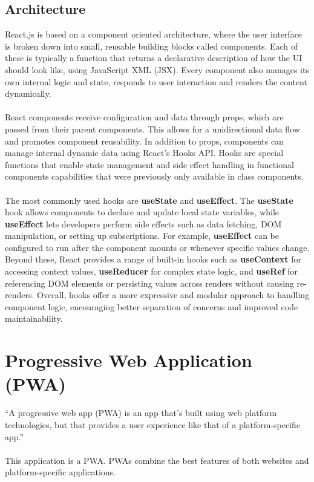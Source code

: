 \documentclass[a4paper,12pt]{report}
\begin{document}
\subsection{Architecture}
React.js is based on a component oriented architecture, where the user interface is broken down into small, reusable building blocks called components. Each of these is typically a function that returns a declarative description of how the UI should look like, using JavaScript XML (JSX). Every component also manages its own internal logic and state, responds to user interaction and renders the content dynamically. \\ \\
React components receive configuration and data through props, which are passed from their parent components. This allows for a unidirectional data flow and promotes component reusability. In addition to props, components can manage internal dynamic data using React’s Hooks API. Hooks are special functions that enable state management and side effect handling in functional components capabilities that were previously only available in class components. \cite{react-docs} \cite{mdn-react} \\ \\
The most commonly used hooks are \textbf{useState} and \textbf{useEffect}. The \textbf{useState} hook allows components to declare and update local state variables, while \textbf{useEffect} lets developers perform side effects such as data fetching, DOM manipulation, or setting up subscriptions. For example, \textbf{useEffect} can be configured to run after the component mounts or whenever specific values change. Beyond these, React provides a range of built-in hooks such as \textbf{useContext} for accessing context values, \textbf{useReducer} for complex state logic, and \textbf{useRef} for referencing DOM elements or persisting values across renders without causing re-renders. Overall, hooks offer a more expressive and modular approach to handling component logic, encouraging better separation of concerns and improved code maintainability. \cite{react-hooks}

\section{Progressive Web Application (PWA)}
“A progressive web app (PWA) is an app that's built using web platform technologies, but that provides a user experience like that of a platform-specific app.” \parencite{mdn-pwa} \\\\
This application is a PWA. PWAs combine the best features of both websites and platform-specific applications. \parencite{mdn-pwa} \\
\end{document}
